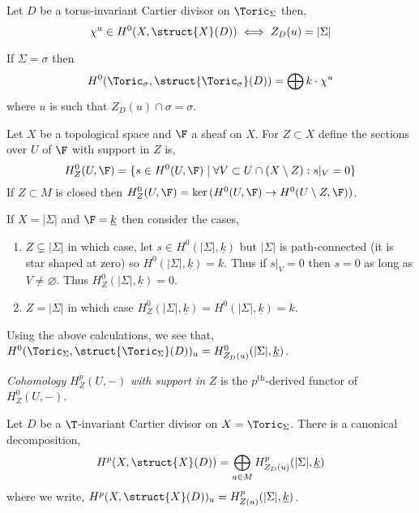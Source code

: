 \begin{corollary}
Let $D$ be a torus-invariant Cartier divisor on $\Toric_\Sigma$ then,
\[ \chi^u \in H^0(X, \struct{X}(D)) \iff Z_D(u) = |\Sigma| \]
\end{corollary}

\begin{example}
If $\Sigma = \sigma$ then
\[ H^0(\Toric_\sigma, \struct{\Toric_\sigma}(D)) = \bigoplus k \cdot \chi^u \]
where $u$ is such that $Z_D(u) \cap \sigma = \sigma$. 
\end{example}

\begin{definition}
Let $X$ be a topological space and $\F$ a sheaf on $X$. For $Z \subset X$ define the sections over $U$ of $\F$ with support in $Z$ is,
\[ H^0_Z(U, \F) = \{ s \in H^0(U, \F) \mid \forall V \subset U \cap (X \setminus Z) : s|_V = 0 \} \]
If $Z \subset M$ is closed then $H^0_Z(U, \F) = \ker{(H^0(U, \F) \to H^0(U \setminus Z, \F))}$. 
\end{definition}

\begin{example}
If $X = |\Sigma|$ and $\F = \underline{k}$ then consider the cases,
\begin{enumerate}
\item $Z \subsetneq |\Sigma|$ in which case, let $s \in H^0(|\Sigma|, \underline{k})$ but $|\Sigma|$ is path-connected (it is star shaped at zero) so $H^0(|\Sigma|, \underline{k}) = k$. Thus if $s|_V = 0$ then $s = 0$ as long as $V \neq \varnothing$. Thus $H_Z^0(|\Sigma|, \underline{k}) = 0$.
\item $Z = |\Sigma|$ in which case $H_Z^0(|\Sigma|, \underline{k}) = H^0(|\Sigma|, \underline{k}) = k$. 
\end{enumerate}
\end{example}

\begin{proposition}
Using the above calculations, we see that,
$H^0(\Toric_\Sigma, \struct{\Toric_\Sigma}(D))_u = H^0_{Z_D(u)}(|\Sigma|, \underline{k})$.
\end{proposition}

\begin{definition}
\textit{Cohomology} $H_Z^p(U, -)$ \textit{with support in} $Z$ is the $p^{\text{th}}$-derived functor of $H^0_Z(U, -)$.
\end{definition}

\begin{theorem}
Let $D$ be a $\T$-invariant Cartier divisor on $X = \Toric_\Sigma$. There is a canonical decomposition,
\[ H^p(X, \struct{X}(D)) = \bigoplus_{u \in M} H^p_{Z_D(u)}(|\Sigma|, \underline{k}) \]
where we write, $H^p(X, \struct{X}(D))_u = H^p_{Z(u)}(|\Sigma|, \underline{k})$.
\end{theorem}

